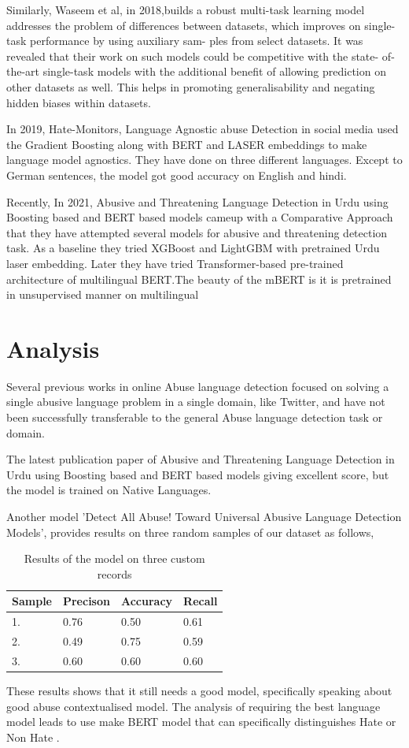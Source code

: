 \documentclass{article}
\begin{document}
Similarly, Waseem
et al, in 2018\cite{elsherief2021latent},builds a robust
multi-task learning model addresses the problem of
differences between datasets, which improves on
single-task performance by using auxiliary sam-
ples from select datasets. It was revealed that their work on such models could be competitive with the state-
of-the-art single-task models with the additional
benefit of allowing prediction on other datasets as
well. This helps in promoting generalisability and negating hidden biases within datasets.

In 2019, Hate-Monitors, Language Agnostic abuse Detection in social media\cite{DBLP:journals/corr/abs-1909-12642} used the Gradient Boosting along with BERT and LASER embeddings to make language model agnostics. They have done on three different languages. Except to German sentences, the model got good accuracy on English and hindi. 

Recently, In 2021, Abusive and Threatening Language Detection in
Urdu using Boosting based and BERT based models\cite{DBLP:journals/corr/abs-2111-14830} cameup with a Comparative Approach that
they have attempted several models for abusive and threatening detection task. As a baseline they tried XGBoost and LightGBM with pretrained Urdu
laser embedding. Later they have tried Transformer-based pre-trained architecture of multilingual
BERT.The beauty of the mBERT is it is pretrained in unsupervised manner on multilingual

\section{Analysis}
Several previous works in online Abuse language detection focused on solving a single abusive language problem in a single domain, like Twitter, and have not been successfully transferable to the general Abuse language detection task or domain. 

The latest publication paper of Abusive and Threatening Language Detection in Urdu using Boosting based and BERT based models giving excellent score, but the model is trained on Native Languages. 

Another model 'Detect All Abuse! Toward Universal Abusive Language Detection Models'\cite{wang-etal-2020-detect}, provides results on three random samples of our dataset as follows,
\begin{table}[h]
\begin{tabular}{llll}
\hline
Sample & Precison & Accuracy & Recall \\
\hline 
1.  &0.76     & 0.50     & 0.61   \\
2.  &0.49     & 0.75     & 0.59   \\
3.  &0.60     & 0.60     & 0.60  
\end{tabular}

\caption{Results of the model on three custom records}
\label{tab:accents}
\end{table}
These results shows that it still needs a good model, specifically speaking about good abuse contextualised model. The analysis of requiring the best language model leads to use make BERT model that can specifically distinguishes Hate or Non Hate .
\end{document}
